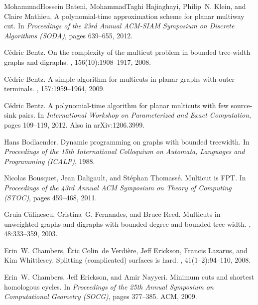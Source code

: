 \documentclass[11pt]{article}
\theoremstyle{plain}  \newtheorem{theorem}{Theorem}[section]
\theoremstyle{definition}
\begin{document}
\begin{thebibliography}{10}

MohammadHossein Bateni, MohammadTaghi Hajiaghayi, {\relax Ph}ilip~N. Klein, and
  Claire Mathieu.
\newblock A polynomial-time approximation scheme for planar multiway cut.
\newblock In {\em Proceedings of the 23rd Annual ACM-SIAM Symposium on Discrete
  Algorithms (SODA)}, pages 639--655, 2012.

C{\'e}dric Bentz.
\newblock On the complexity of the multicut problem in bounded tree-width
  graphs and digraphs.
, 156(10):1908--1917, 2008.

C{\'e}dric Bentz.
\newblock A simple algorithm for multicuts in planar graphs with outer
  terminals.
, 157:1959--1964, 2009.

C{\'e}dric Bentz.
\newblock A polynomial-time algorithm for planar multicuts with few source-sink
  pairs.
\newblock In {\em International Workshop on Parameterized and Exact
  Computation}, pages 109--119, 2012.
\newblock Also in arXiv:1206.3999.

Hans Bodlaender.
\newblock Dynamic programming on graphs with bounded treewidth.
\newblock In {\em Proceedings of the 15th International Colloquium on Automata,
  Languages and Programming (ICALP)}, 1988.

Nicolas Bousquet, Jean Daligault, and St{\'e}phan Thomass{\'e}.
\newblock Multicut is {FPT}.
\newblock In {\em Proceedings of the 43rd Annual ACM Symposium on Theory of
  Computing (STOC)}, pages 459--468, 2011.

Gruia C{\u a}linescu, Cristina~G. Fernandes, and Bruce Reed.
\newblock Multicuts in unweighted graphs and digraphs with bounded degree and
  bounded tree-width.
, 48:333--359, 2003.

Erin~W. Chambers, {\'E}ric Colin~de Verdi{\`e}re, Jeff Erickson, Francis
  Lazarus, and Kim Whittlesey.
\newblock Splitting (complicated) surfaces is hard.
,
  41(1--2):94--110, 2008.

Erin~W. Chambers, Jeff Erickson, and Amir Nayyeri.
\newblock Minimum cuts and shortest homologous cycles.
\newblock In {\em Proceedings of the 25th Annual Symposium on Computational
  Geometry (SOCG)}, pages 377--385. ACM, 2009.


\end{thebibliography}
\end{document}

